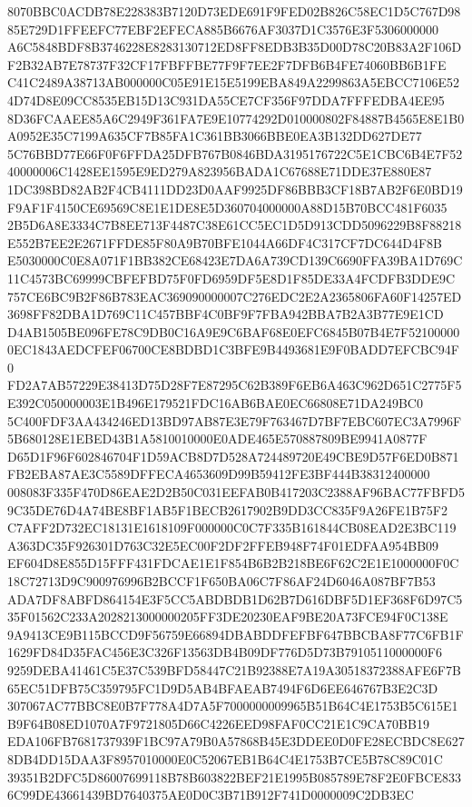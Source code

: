\documentclass[UTF8,fontset=fandol,zihao=-4,a4paper]{ctexart}
\begin{document}
{{8070BBC0ACDB78E228383B7120D73EDE691F9FED02B826C58EC1D5C767D9885E729D1FFEEFC77EBF2EFECA885B6676AF3037D1C3576E3F5306000000
A6C5848BDF8B3746228E8283130712ED8FF8EDB3B35D00D78C20B83A2F106DF2B32AB7E78737F32CF17FBFFBE77F9F7EE2F7DFB6B4FE74060BB6B1FE
C41C2489A38713AB000000C05E91E15E5199EBA849A2299863A5EBCC7106E524D74D8E09CC8535EB15D13C931DA55CE7CF356F97DDA7FFFEDBA4EE95
8D36FCAAEE85A6C2949F361FA7E9E10774292D010000802F84887B4565E8E1B0A0952E35C7199A635CF7B85FA1C361BB3066BBE0EA3B132DD627DE77
5C76BBD77E66F0F6FFDA25DFB767B0846BDA3195176722C5E1CBC6B4E7F5240000006C1428EE1595E9ED279A823956BADA1C67688E71DDE37E880E87
1DC398BD82AB2F4CB4111DD23D0AAF9925DF86BBB3CF18B7AB2F6E0BD19F9AF1F4150CE69569C8E1E1DE8E5D360704000000A88D15B70BCC481F6035
2B5D6A8E3334C7B8EE713F4487C38E61CC5EC1D5D913CDD5096229B8F88218E552B7EE2E2671FFDE85F80A9B70BFE1044A66DF4C317CF7DC644D4F8B
E5030000C0E8A071F1BB382CE68423E7DA6A739CD139C6690FFA39BA1D769C11C4573BC69999CBFEFBD75F0FD6959DF5E8D1F85DE33A4FCDFB3DDE9C
757CE6BC9B2F86B783EAC369090000007C276EDC2E2A2365806FA60F14257ED3698FF82DBA1D769C11C457BBF4C0BF9F7FBA942BBA7B2A3B77E9E1CD
D4AB1505BE096FE78C9DB0C16A9E9C6BAF68E0EFC6845B07B4E7F521000000EC1843AEDCFEF06700CE8BDBD1C3BFE9B4493681E9F0BADD7EFCBC94F0
FD2A7AB57229E38413D75D28F7E87295C62B389F6EB6A463C962D651C2775F5E392C050000003E1B496E179521FDC16AB6BAE0EC66808E71DA249BC0
5C400FDF3AA434246ED13BD97AB87E3E79F763467D7BF7EBC607EC3A7996F5B680128E1EBED43B1A5810010000E0ADE465E570887809BE9941A0877F
D65D1F96F602846704F1D59ACB8D7D528A724489720E49CBE9D57F6ED0B871FB2EBA87AE3C5589DFFECA4653609D99B59412FE3BF444B38312400000
008083F335F470D86EAE2D2B50C031EEFAB0B417203C2388AF96BAC77FBFD59C35DE76D4A74BE8BF1AB5F1BECB2617902B9DD3CC835F9A26FE1B75F2
C7AFF2D732EC18131E1618109F000000C0C7F335B161844CB08EAD2E3BC119A363DC35F926301D763C32E5EC00F2DF2FFEB948F74F01EDFAA954BB09
EF604D8E855D15FFF431FDCAE1E1F854B6B2B218BE6F62C2E1E1000000F0C18C72713D9C900976996B2BCCF1F650BA06C7F86AF24D6046A087BF7B53
ADA7DF8ABFD864154E3F5CC5ABDBDB1D62B7D616DBF5D1EF368F6D97C535F01562C233A2028213000000205FF3DE20230EAF9BE20A73FCE94F0C138E
9A9413CE9B115BCCD9F56759E66894DBABDDFEFBF647BBCBA8F77C6FB1F1629FD84D35FAC456E3C326F13563DB4B09DF776D5D73B7910511000000F6
9259DEBA41461C5E37C539BFD58447C21B92388E7A19A30518372388AFE6F7B65EC51DFB75C359795FC1D9D5AB4BFAEAB7494F6D6EE646767B3E2C3D
307067AC77BBC8E0B7F778A4D7A5F7000000009965B51B64C4E1753B5C615E1B9F64B08ED1070A7F9721805D66C4226EED98FAF0CC21E1C9CA70BB19
EDA106FB7681737939F1BC97A79B0A57868B45E3DDEE0D0FE28ECBDC8E6278DB4DD15DAA3F8957010000E0C52067EB1B64C4E1753B7CE5B78C89C01C
39351B2DFC5D86007699118B78B603822BEF21E1995B085789E78F2E0FBCE8336C99DE43661439BD7640375AE0D0C3B71B912F741D0000009C2DB3EC
}}
\end{document}
